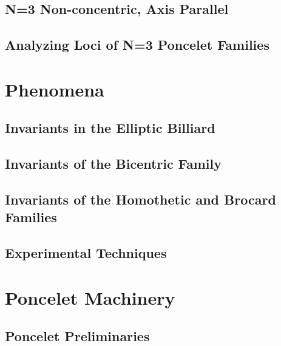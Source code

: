 \documentclass{book}
\begin{document}
\chapter{N=3 Non-concentric, Axis Parallel}
\label{chap:03-n3-ncap}
%

\chapter{Analyzing Loci of N=3 Poncelet Families}
\label{chap:04-n3-loci}
%

\part{ Phenomena}

\chapter[Billiard Invariants]{Invariants in the Elliptic Billiard}
\label{chap:05-billiard}

\chapter[Bicentric Invariants]{Invariants of the Bicentric Family}
\label{chap:06-bicentric}

\chapter[Homothetic and Brocard Invariants]{Invariants of the Homothetic and Brocard Families}
\label{chap:07-homoth}

\chapter{Experimental Techniques}
\label{chap:08-experimental}

\part{Poncelet Machinery}

\chapter{Poncelet Preliminaries}
\label{chap:02-poncelet-prelims}
%
\end{document}
